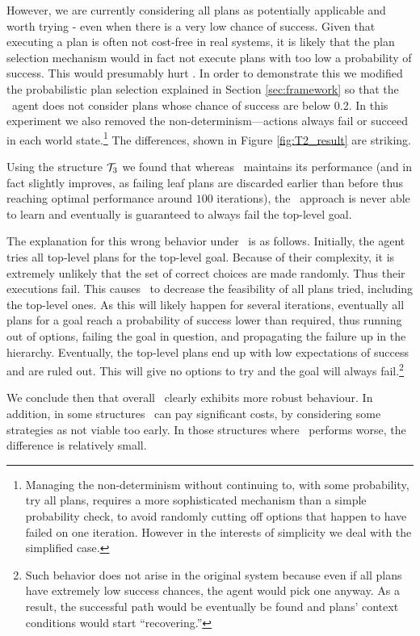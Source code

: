 However, we are currently considering all plans as potentially
applicable and worth trying - even when there is a very low chance of
success. Given that executing a plan is often not cost-free in real
systems, it is likely that the plan selection mechanism would in fact
not execute plans with too low a probability of success. This would
presumably hurt \CL.
% 
In order to demonstrate this we modified the probabilistic plan
selection explained in Section \ref{sec:framework} so that the \JACK\
agent does not consider plans whose chance of success are below 0.2.
In this experiment we also removed the non-determinism---actions
always fail or succeed in each world state.\footnote{Managing the
non-determinism without continuing to, with some probability, try all
plans, requires a more sophisticated mechanism than a simple
probability check, to avoid randomly cutting off options that happen
to have failed on one iteration. However in the interests of
simplicity we deal with the simplified case.}
%
The differences, shown in Figure \ref{fig:T2_result} are striking.

Using the structure 
${\mathcal{T}}_3$ we  found that whereas \BUL\ maintains its performance (and in
fact slightly improves, as failing leaf plans are discarded earlier
than before thus reaching optimal performance around $100$
iterations), the \CL\ approach is never able to learn and eventually
is guaranteed to always fail the top-level goal.

The explanation for this wrong behavior under \CL\ is as
follows. Initially, the agent tries all top-level plans for the
top-level goal. Because of their complexity, it is extremely unlikely
that the set of correct choices are made randomly. Thus their
executions fail.
This causes \CL\ to decrease the feasibility of all plans
tried, including the top-level ones. As this will likely happen
for several iterations, eventually all plans for a goal reach a probability of
success lower than required, thus
running out of options, failing the goal in question, and propagating
the failure up in the hierarchy. Eventually, the top-level plans end
up with low expectations of success and are ruled out.
This will give no options to try and the goal will always
fail.\footnote{Such behavior does not arise in the original
system because even if all plans have extremely low success chances,
the agent would pick one anyway. As a result, the successful path
would be eventually be found and plans' context conditions would start
``recovering.''}

We conclude then that overall \BUL\ clearly exhibits more robust
behaviour. In addition, in some structures \CL\ can pay significant
costs, by considering some strategies as not viable too early. In
those structures where \BUL\ performs worse, the difference is
relatively small. 

